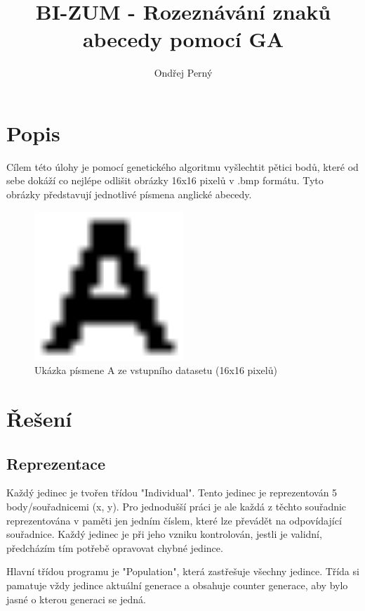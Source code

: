 \documentclass[12pt,a4paper]{article}
\author{Ondřej Perný}
\title
	{{BI-ZUM - Rozeznávání znaků abecedy pomocí GA} \\ 
}
\begin{document}

\maketitle


\section{Popis}
Cílem této úlohy je pomocí genetického algoritmu vyšlechtit pětici bodů, které od sebe dokáží co nejlépe odlišit obrázky 16x16 pixelů v .bmp formátu. Tyto obrázky představují jednotlivé písmena anglické abecedy.

\begin{figure}
  \begin{center}
    \includegraphics[width=0.5\textwidth]{a.png}
  \end{center}
  \caption{Ukázka písmene A ze vstupního datasetu (16x16 pixelů)}
  \label{fig:image6}
\end{figure}

\newpage
\section{Řešení}
\subsection{Reprezentace}
Každý jedinec je tvořen třídou "Individual". Tento jedinec je reprezentován 5 body/souřadnicemi (x, y). Pro jednodušší práci je ale každá z těchto souřadnic reprezentována v paměti jen jedním číslem, které lze převádět na odpovídající souřadnice. Každý jedinec je při jeho vzniku kontrolován, jestli je validní, předcházím tím potřebě opravovat chybné jedince.

Hlavní třídou programu je "Population", která zastřešuje všechny jedince. Třída si pamatuje vždy jedince aktuální generace a obsahuje counter generace, aby bylo jasné o kterou generaci se jedná.
\end{document}
